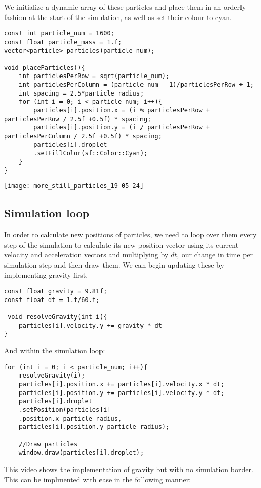 \documentclass[write-up.tex]{subfiles}
\begin{document}
We initialize a dynamic array of these particles and place them in an orderly fashion at the start of the simulation, as well as set their colour to cyan.

\begin{lstlisting}
const int particle_num = 1600;
const float particle_mass = 1.f;
vector<particle> particles(particle_num);

void placeParticles(){
    int particlesPerRow = sqrt(particle_num);
    int particlesPerColumn = (particle_num - 1)/particlesPerRow + 1;
    int spacing = 2.5*particle_radius;
    for (int i = 0; i < particle_num; i++){
        particles[i].position.x = (i % particlesPerRow + particlesPerRow / 2.5f +0.5f) * spacing;
        particles[i].position.y = (i / particlesPerRow + particlesPerColumn / 2.5f +0.5f) * spacing;
        particles[i].droplet
        .setFillColor(sf::Color::Cyan);
    }
}

\end{lstlisting}

\texttt{[image: more\_still\_particles\_19-05-24]}

\subsection{Simulation loop}
In order to calculate new positions of particles, we need to loop over them every step of the simulation to calculate its new position vector using its current velocity and acceleration vectors and multiplying by $dt$, our change in time per simulation step and then draw them. We can begin updating these by implementing gravity first.
\begin{lstlisting}
const float gravity = 9.81f;
const float dt = 1.f/60.f;

 void resolveGravity(int i){
    particles[i].velocity.y += gravity * dt
}
\end{lstlisting}

And within the simulation loop:
\begin{lstlisting}
for (int i = 0; i < particle_num; i++){
    resolveGravity(i);
    particles[i].position.x += particles[i].velocity.x * dt;
    particles[i].position.y += particles[i].velocity.y * dt;
    particles[i].droplet
    .setPosition(particles[i]
    .position.x-particle_radius,
    particles[i].position.y-particle_radius);

    //Draw particles
    window.draw(particles[i].droplet);
\end{lstlisting}
This \href{https://youtube.com/shorts/FSuH_Cs1Qh4?feature=share}{video} shows the implementation of gravity but with no simulation border. This can be implmented with ease in the following manner:
\end{document}
